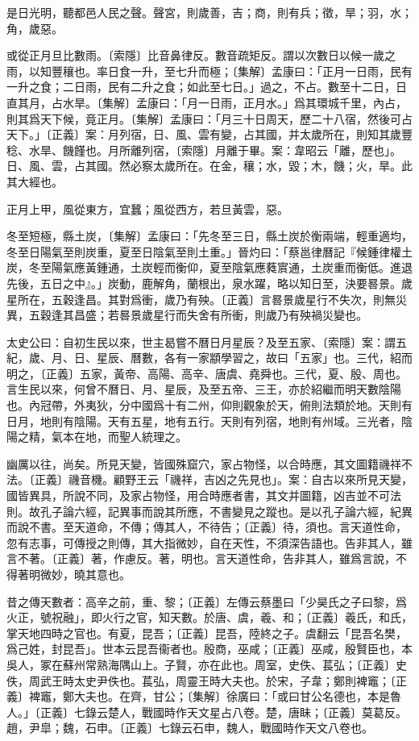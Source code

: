 是日光明，聽都邑人民之聲。聲宮，則歲善，吉；商，則有兵；徵，旱；羽，水；角，歲惡。

或從正月旦比數雨。〔索隱〕比音鼻律反。數音疏矩反。謂以次數日以候一歲之雨，以知豐穰也。率日食一升，至七升而極；〔集解〕孟康曰：「正月一日雨，民有一升之食；二日雨，民有二升之食；如此至七日。」過之，不占。數至十二日，日直其月，占水旱。〔集解〕孟康曰：「月一日雨，正月水。」爲其環城千里，內占，則其爲天下候，竟正月。〔集解〕孟康曰：「月三十日周天，歷二十八宿，然後可占天下。」〔正義〕案：月列宿，日、風、雲有變，占其國，并太歲所在，則知其歲豐稔、水旱、饑饉也。月所離列宿，〔索隱〕月離于畢。案：韋昭云「離，歷也」。日、風、雲，占其國。然必察太歲所在。在金，穰；水，毀；木，饑；火，旱。此其大經也。

正月上甲，風從東方，宜蠶；風從西方，若旦黃雲，惡。

冬至短極，縣土炭，〔集解〕孟康曰：「先冬至三日，縣土炭於衡兩端，輕重適均，冬至日陽氣至則炭重，夏至日陰氣至則土重。」晉灼曰：「蔡邕律曆記『候鍾律權土炭，冬至陽氣應黃鍾通，土炭輕而衡仰，夏至陰氣應蕤賔通，土炭重而衡低。進退先後，五日之中』。」炭動，鹿解角，蘭根出，泉水躍，略以知日至，決要晷景。歲星所在，五穀逢昌。其對爲衝，歲乃有殃。〔正義〕言晷景歲星行不失次，則無災異，五穀逢其昌盛；若晷景歲星行而失舍有所衝，則歲乃有殃禍災變也。

太史公曰：自初生民以來，世主曷嘗不曆日月星辰？及至五家、〔索隱〕案：謂五紀，歲、月、日、星辰、曆數，各有一家顓學習之，故曰「五家」也。三代，紹而明之，〔正義〕五家，黃帝、高陽、高辛、唐虞、堯舜也。三代，夏、殷、周也。言生民以來，何曾不曆日、月、星辰，及至五帝、三王，亦於紹繼而明天數陰陽也。內冠帶，外夷狄，分中國爲十有二州，仰則觀象於天，俯則法類於地。天則有日月，地則有陰陽。天有五星，地有五行。天則有列宿，地則有州域。三光者，陰陽之精，氣本在地，而聖人統理之。

幽厲以往，尚矣。所見天變，皆國殊窟穴，家占物怪，以合時應，其文圖籍禨祥不法。〔正義〕禨音機。顧野王云「禨祥，吉凶之先見也」。案：自古以來所見天變，國皆異具，所說不同，及家占物怪，用合時應者書，其文并圖籍，凶吉並不可法則。故孔子論六經，記異事而說其所應，不書變見之蹤也。是以孔子論六經，紀異而說不書。至天道命，不傳；傳其人，不待告；〔正義〕待，須也。言天道性命，忽有志事，可傳授之則傳，其大指微妙，自在天性，不須深告語也。告非其人，雖言不著。〔正義〕著，作慮反。著，明也。言天道性命，告非其人，雖爲言說，不得著明微妙，曉其意也。

昔之傳天數者：高辛之前，重、黎；〔正義〕左傳云蔡墨曰「少昊氏之子曰黎，爲火正，號祝融」，即火行之官，知天數。於唐、虞，羲、和；〔正義〕羲氏，和氏，掌天地四時之官也。有夏，昆吾；〔正義〕昆吾，陸終之子。虞翻云「昆吾名樊，爲己姓，封昆吾」。世本云昆吾衞者也。殷商，巫咸；〔正義〕巫咸，殷賢臣也，本吳人，冢在蘇州常熟海隅山上。子賢，亦在此也。周室，史佚、萇弘；〔正義〕史佚，周武王時太史尹佚也。萇弘，周靈王時大夫也。於宋，子韋；鄭則裨竈；〔正義〕裨竈，鄭大夫也。在齊，甘公；〔集解〕徐廣曰：「或曰甘公名德也，本是魯人。」〔正義〕七錄云楚人，戰國時作天文星占八卷。楚，唐眛；〔正義〕莫葛反。趙，尹皐；魏，石申。〔正義〕七錄云石申，魏人，戰國時作天文八卷也。

